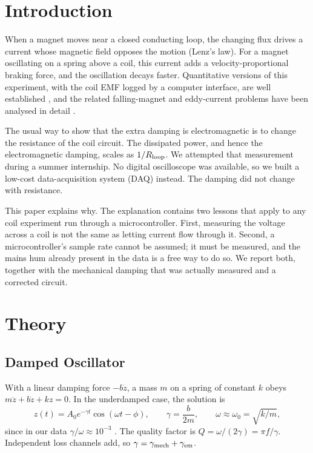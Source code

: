 \documentclass[12pt,a4paper]{article}
\begin{document}
\section{Introduction}

When a magnet moves near a closed conducting loop, the changing flux drives a current whose magnetic field opposes the motion (Lenz's law). For a magnet oscillating on a spring above a coil, this current adds a velocity-proportional braking force, and the oscillation decays faster. Quantitative versions of this experiment, with the coil EMF logged by a computer interface, are well established \parencite{Singh2002,Kingman2002}, and the related falling-magnet and eddy-current problems have been analysed in detail \parencite{Hahn1998,Saslow1987}.

The usual way to show that the extra damping is electromagnetic is to change the resistance of the coil circuit. The dissipated power, and hence the electromagnetic damping, scales as $1/R_{\rm loop}$. We attempted that measurement during a summer internship. No digital oscilloscope was available, so we built a low-cost data-acquisition system (DAQ) instead. The damping did not change with resistance.

This paper explains why. The explanation contains two lessons that apply to any coil experiment run through a microcontroller. First, measuring the voltage across a coil is not the same as letting current flow through it. Second, a microcontroller's sample rate cannot be assumed; it must be measured, and the mains hum already present in the data is a free way to do so. We report both, together with the mechanical damping that was actually measured and a corrected circuit.

\section{Theory}

\subsection{Damped Oscillator}

With a linear damping force $-b\dot z$, a mass $m$ on a spring of constant $k$ obeys $m\ddot z + b\dot z + kz = 0$. In the underdamped case, the solution is
\begin{equation}
z(t) = A_0 e^{-\gamma t}\cos(\omega t - \phi), \qquad \gamma = \frac{b}{2m}, \qquad \omega \approx \omega_0 = \sqrt{k/m},
\end{equation}
since in our data $\gamma/\omega \approx 10^{-3}$ \parencite{French1971}. The quality factor is $Q = \omega/(2\gamma) = \pi f/\gamma$. Independent loss channels add, so $\gamma = \gamma_{\rm mech} + \gamma_{\rm em}$.
\end{document}
